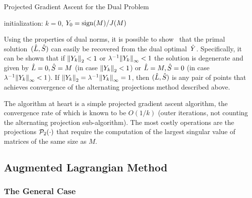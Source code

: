 \documentclass{../../common/projectreport}
\begin{document}
%
\begin{algorithm}
\caption{Projected Gradient Ascent for the Dual Problem}
initialization: $k=0$, $Y_0 = \operatorname{sign}(M)/J(M)$\;
\label{Algorithms:MainAlgs:GAD:Algorithm}
\end{algorithm}

Using the properties of dual norms, it is possible to show~\cite{Lin:2009kx} that the primal solution~$({\hat{L}},{\hat{S}})$ can easily be recovered from the dual optimal~${\hat{Y}}$. Specifically, it can be shown that if ${\left\|Y_k\right\|}_{2}^{} <1$ or $\lambda^{-1}{\left\|Y_k\right\|}_{\infty}^{}<1$ the solution is degenerate and given by ${\hat{L}} = 0,{\hat{S}} =M$ (in case ${\left\|Y_k\right\|}_{2}^{} <1$) or ${\hat{L}} = M,{\hat{S}} =0$ (in case $\lambda^{-1} {\left\|Y_k\right\|}_{\infty}^{} <1$). If ${\left\|Y_k\right\|}_{2}^{} = \lambda^{-1} {\left\|Y_k\right\|}_{\infty}^{} =1$, then $({\hat{L}},{\hat{S}})$ is any pair of points that achieves convergence of the alternating projections method described above. 

The algorithm at heart is a simple projected gradient ascent algorithm, the convergence rate of which is known to be $O(1/k)$ (outer iterations, not counting the alternating projection sub-algorithm). The most costly operations are the projections ${\mathcal{P}}_{2}(\cdot)$ that require the computation of the largest singular value of matrices of the same size as $M$. 




\subsection{Augmented Lagrangian Method}
\label{Algorithms:MainAlgs:AugLag:Subsec}


\subsubsection{The General Case}
\label{Algorithms:MainAlgs:AugLag:General:Subsubsec}
\end{document}
